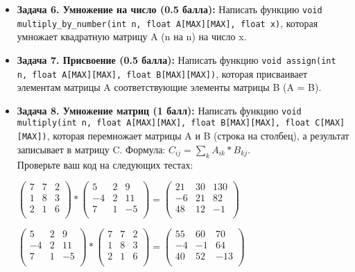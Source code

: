 \documentclass{article}
\begin{document}
\begin{itemize}
\item \textbf{Задача 6. Умножение на число (0.5 балла):} Написать функцию \texttt{void multiply\_by\_number(int n, float A[MAX][MAX], float x)}, которая умножает квадратную матрицу A (n на n) на число x.
\item \textbf{Задача 7. Присвоение (0.5 балла):} Написать функцию \texttt{void assign(int n, float A[MAX][MAX], float B[MAX][MAX])}, которая присваивает элементам матрицы A соответствующие элементы матрицы B (A = B).
\item \textbf{Задача 8. Умножение матриц (1 балл):} Написать функцию \texttt{void multiply(int n, float A[MAX][MAX], float B[MAX][MAX], float C[MAX][MAX])}, которая перемножает матрицы A и B (строка на столбец), а результат записывает в матрицу C. Формула: $C_{ij} = \sum\limits_k A_{ik}*B_{kj}$. \\
Проверьте ваш код на следующих тестах:

\begin{center}
$\begin{pmatrix}
7 & 7 & 2 \\
1 & 8 & 3 \\
2 & 1 & 6 \\
\end{pmatrix} * 
\begin{pmatrix}
5 & 2 & 9 \\
-4 & 2 & 11 \\
7 & 1 & -5 \\
\end{pmatrix}=
\begin{pmatrix}
21 & 30 & 130 \\
-6 & 21 & 82 \\
48 & 12 & -1 \\
\end{pmatrix}
$
\end{center}

\begin{center}

$
\begin{pmatrix}
5 & 2 & 9 \\
-4 & 2 & 11 \\
7 & 1 & -5 \\
\end{pmatrix} *
\begin{pmatrix}
7 & 7 & 2 \\
1 & 8 & 3 \\
2 & 1 & 6 \\
\end{pmatrix}
=
\begin{pmatrix}
55 & 60 & 70 \\
-4 & -1 & 64 \\
40 & 52 & -13 \\
\end{pmatrix}
$
\end{center}


\end{itemize}
\end{document}
